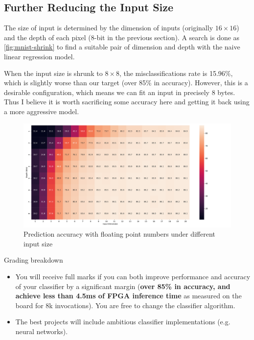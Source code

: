 \subsection{Further Reducing the Input Size}

The size of input is determined by the dimension of inputs (originally \(16 \times 16\)) and the depth of each pixel (8-bit in the previous section).
A search is done as \autoref{fig:mnist-shrink} to find a suitable pair of dimension and depth with the naive linear regression model.


When the input size is shrunk to \(8 \times 8\), the misclassifications rate is 15.96\%, which is slightly worse than our target (over 85\% in accuracy).
However, this is a desirable configuration, which means we can fit an input in precisely 8 bytes.
Thus I believe it is worth sacrificing some accuracy here and getting it back using a more aggressive model.

\begin{figure}[ht!]
    \centering
    \includegraphics[width=\textwidth]{images/mnist-shrink.pdf}
    \caption{Prediction accuracy with floating point numbers under different input size}
    \label{fig:mnist-shrink}
\end{figure}


Grading breakdown

\begin{itemize}
    \item You will receive full marks if you can both improve performance and accuracy of your classifier by a significant margin (\textbf{over 85\% in accuracy, and achieve less than 4.5ms of FPGA inference time} as measured on the board for 8k invocations). You are free to change the classifier algorithm.
    \item The best projects will include ambitious classifier implementations (e.g. neural networks).
\end{itemize}

